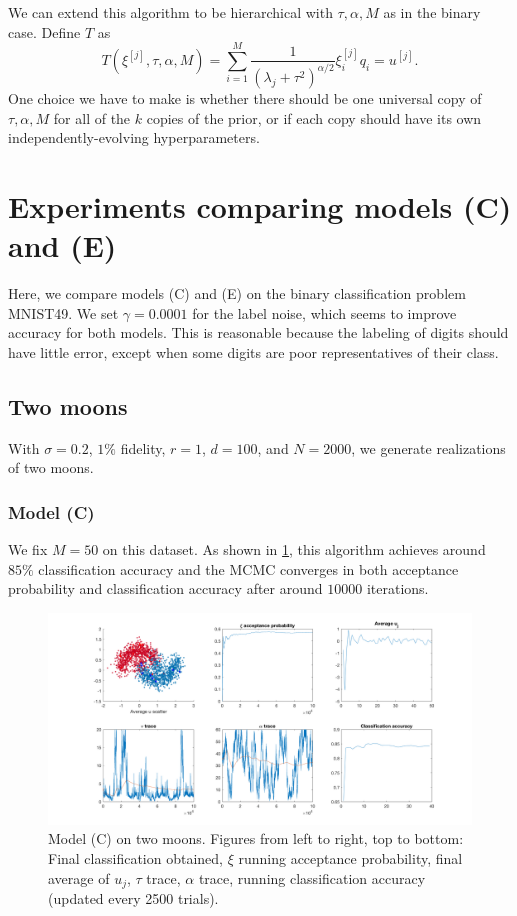 \documentclass{siamart1116}
\begin{document}
        We can extend this algorithm to be hierarchical with $\tau, \alpha, M$ as in the binary case. Define $T$ as
         \[T(\xi^{[j]}, \tau, \alpha, M) = \sum_{i=1}^M \frac{1}{(\lambda_j + \tau^2)^{\alpha/2}} \xi^{[j]}_i q_i = u^{[j]}.\]
         One choice we have to make is whether there should be one universal copy of $\tau, \alpha, M$ for all of the $k$ copies of the prior, or if each copy should have its own independently-evolving hyperparameters.

\section{Experiments comparing models (C) and (E)}
    Here, we compare models (C) and (E) on the binary classification problem MNIST49. We set $\gamma = 0.0001$ for the label noise, which seems to improve accuracy for both models. This is reasonable because the labeling of digits should have little error, except when some digits are poor representatives of their class.
    
    \iffalse
    \subsection{Two moons}
        With $\sigma=0.2$, $1\%$ fidelity, $r=1$, $d=100$, and $N=2000$, we generate realizations of two moons.
        \subsubsection{Model (C)}
            We fix $M=50$ on this dataset. As shown in \cref{fig:model_c_two_moons}, this algorithm achieves around $85\%$ classification accuracy and the MCMC converges in both acceptance probability and classification accuracy after around $10000$ iterations.
            \begin{figure}[!htb]
                \centering
                \caption{\label{fig:model_c_two_moons}Model (C) on two moons. Figures from left to right, top to bottom: Final classification obtained, $\xi$ running acceptance probability, final average of $u_j$, $\tau$ trace, $\alpha$ trace, running classification accuracy (updated every 2500 trials).}
                \includegraphics[width=0.8\linewidth]{model_c_vs_model_e/moons/learn_t_a/all.png}
            \end{figure}
\end{document}
